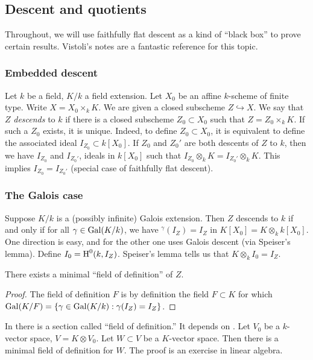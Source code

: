 \subsection{Descent and quotients}

Throughout, we will use faithfully flat descent as a kind of ``black box'' to 
prove certain results. Vistoli's notes \cite{vo05} are a fantastic reference for 
this topic. 


\subsubsection{Embedded descent}

Let $k$ be a field, $K/k$ a field extension. Let $X_0$ be an affine $k$-scheme 
of finite type. Write $X=X_0\times_k K$. We are given a closed subscheme 
$Z\hookrightarrow X$. We say that $Z$ \emph{descends} to $k$ if there is a closed 
subscheme $Z_0\subset X_0$ such that $Z=Z_0\times_k K$. If such a $Z_0$ exists, 
it is unique. Indeed, to define $Z_0\subset X_0$, it is equivalent to 
define the associated ideal $I_{Z_0}\subset k[X_0]$. If $Z_0$ and $Z_0'$ are 
both descents of $Z$ to $k$, then we have $I_{Z_0}$ and $I_{Z_0'}$, ideals 
in $k[X_0]$ such that $I_{Z_0}\otimes_k K=I_{Z_0'}\otimes_k K$. This implies 
$I_{Z_0} = I_{Z_0'}$ (special case of faithfully flat descent). 


\subsubsection{The Galois case}

Suppose $K/k$ is a (possibly infinite) Galois extension. Then $Z$ descends to 
$k$ if and only if for all $\gamma\in \operatorname{Gal}(K/k)$, we have 
$^\gamma(I_Z) = I_Z$ in $K[X_0] = K\otimes_k k[X_0]$. One direction is easy, 
and for the other one uses Galois descent (via Speiser's lemma). Define 
$I_0=\operatorname{H}^0(k, I_Z)$. Speiser's lemma tells us that $K\otimes_k I_0 = I_Z$. 

\begin{coro}
There exists a minimal ``field of definition'' of $Z$.
\end{coro}
\begin{proof}
The field of definition $F$ is by definition the field $F\subset K$ for which 
$\operatorname{Gal}(K/F)=\{\gamma\in \operatorname{Gal}(K/k):\gamma(I_Z)=I_Z\}$. 
\end{proof}

In \cite[4.8]{ega4} there is a section called ``field of definition.'' It 
depends on \cite[II.8]{b03}. Let $V_0$ be a $k$-vector space, 
$V=K\otimes V_0$. Let $W\subset V$ be a $K$-vector space. Then there is a 
minimal field of definition for $W$. The proof is an exercise in linear 
algebra. 

